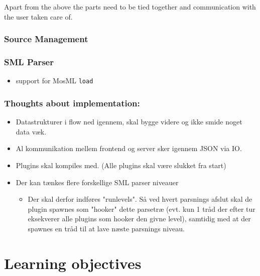\documentclass[a4paper,oneside]{memoir}
\begin{document}
Apart from the above the parts need to be tied together and communication with the user taken care
of.


\subsubsection{Source Management}



\subsubsection{SML Parser}


\begin{itemize}

\item support for MosML \texttt{load}


\end{itemize}




\subsubsection{Thoughts about implementation:}
\begin{itemize}
\item Datastrukturer i flow ned igennem, skal bygge videre og ikke smide noget
  data væk.

\item Al kommunikation mellem frontend og server sker igennem JSON via IO.

\item Plugins skal kompiles med. (Alle plugins skal være slukket fra start)


\item Der kan tænkes flere forskellige SML parser niveauer 
  \begin{itemize}

  \item Der skal derfor indføres "runlevels". Så ved hvert parsnings afslut skal
    de plugin spawnes som "hooker" dette parsetræ (evt. kun 1 tråd der efter tur
    eksekverer alle plugins som hooker den givne level), samtidig med at der
    spawnes en tråd til at lave næste parsnings niveau.
  \end{itemize}
\end{itemize}

\section{Learning objectives}
\end{document}
